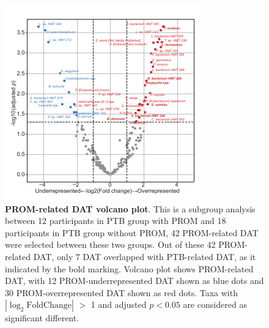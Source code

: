 \documentclass[11pt, a4paper, onecolumn, oneside]{report}
\begin{document}
            \begin{figure}[p]
                \centering
                \includegraphics[width=12 cm]{Figures/PTB/FigS2-PROM.pdf}
                \caption[PROM-related DAT volcano plot]{\textbf{PROM-related DAT volcano plot}. This is a subgroup analysis between 12 participants in PTB group with PROM and 18 participants in PTB group without PROM, 42 PROM-related DAT were selected between these two groups. Out of these 42 PROM-related DAT, only 7 DAT overlapped with PTB-related DAT, as it indicated by the bold marking. Volcano plot shows PROM-related DAT, with 12 PROM-underrepresented DAT shown as blue dots and 30 PROM-overrepresented DAT shown as red dots. Taxa with $| \log _2 \textrm{FoldChange} |$ $>$ 1 and adjusted $p < 0.05$ are considered as significant different.}
                \label{fig:PTB-volcano}
            \end{figure}
            \clearpage
\end{document}
